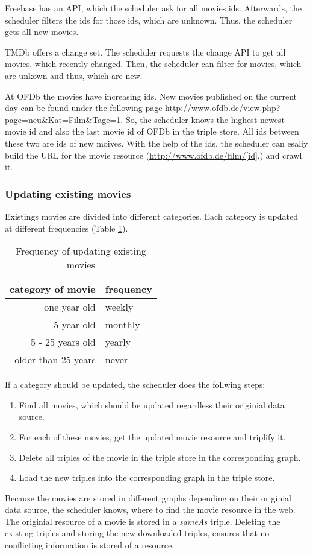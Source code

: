 Freebase has an API, which the scheduler ask for all movies ids.
Afterwards, the scheduler filters the ids for those ids, which are unknown.
Thus, the scheduler gets all new movies.

TMDb offers a change set.
The scheduler requests the change API to get all movies, which recently changed.
Then, the scheduler can filter for movies, which are unkown and thus, which are new.

At OFDb the movies have increasing ids.
New movies published on the current day can be found under the following page \url{http://www.ofdb.de/view.php?page=neu&Kat=Film&Tage=1}.
So, the scheduler knows the highest newest movie id and also the last movie id of OFDb in the triple store.
All ids between these two are ids of new moives.
With the help of the ids, the scheduler can esaliy build the URL for the movie resource (\url{http://www.ofdb.de/film/[id],}) and crawl it.

\subsubsection{Updating existing movies}
Existings movies are divided into different categories.
Each category is updated at different frequencies (Table \ref{tab_updating_existing}).
\begin{table}[ht]
	\caption{Frequency of updating existing movies}
	\begin{center}
	\begin{tabular}{rl}
		\textbf{category of movie} & \textbf{frequency} \\ \hline
		one year old & weekly \\
		5 year old & monthly \\
		5 - 25 years old & yearly \\
		older than 25 years & never \\
	\end{tabular}
	\end{center}
	\label{tab_updating_existing}
\end{table}
If a category should be updated, the scheduler does the follwing steps:
\begin{enumerate}
	\item Find all movies, which should be updated regardless their originial data source.
	\item For each of these movies, get the updated movie resource and triplify it.
	\item Delete all triples of the movie in the triple store in the corresponding graph.
	\item Load the new triples into the corresponding graph in the triple store.
\end{enumerate}
Because the movies are stored in different graphs depending on their originial data source, the scheduler knows, where to find the movie resource in the web.
The originial resource of a movie is stored in a \emph{sameAs} triple.
Deleting the existing triples and storing the new downloaded triples, ensures that no conflicting information is stored of a resource.